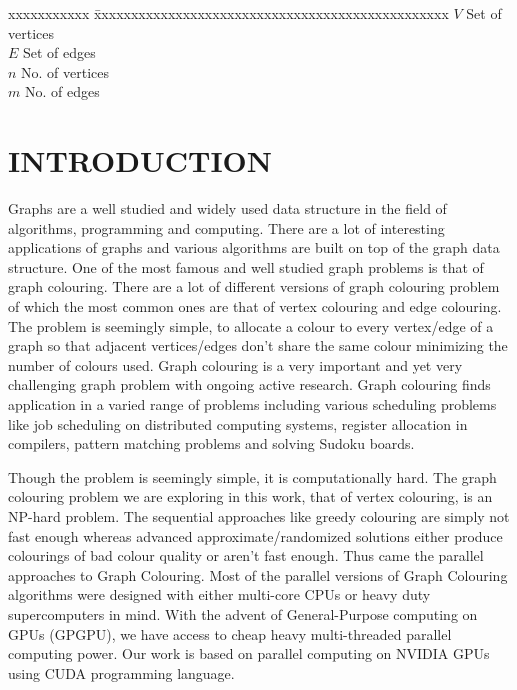 \documentclass[MTech]{iitmdiss}
\begin{document}
\begin{singlespace}
\begin{tabbing}
xxxxxxxxxxx \= xxxxxxxxxxxxxxxxxxxxxxxxxxxxxxxxxxxxxxxxxxxxxxxx \kill
\textbf{$V$}  \> Set of vertices \\
\textbf{$E$}  \> Set of edges \\
\textbf{$n$}   \> No. of vertices \\
\textbf{$m$}  \> No. of edges \\
\end{tabbing}
\end{singlespace}

\pagebreak
\clearpage





\chapter{INTRODUCTION}
\label{chap:intro}
Graphs are a well studied and widely used data structure in the field of algorithms, programming and computing. There are a lot of interesting applications of graphs and various algorithms are built on top of the graph data structure. One of the most famous and well studied graph problems is that of graph colouring. There are a lot of different versions of graph colouring problem of which the most common ones are that of vertex colouring and edge colouring. The problem is seemingly simple, to allocate a colour to every vertex/edge of a graph so that adjacent vertices/edges don't share the same colour minimizing the number of colours used.  
Graph colouring is a very important and yet very challenging graph problem with ongoing active research. Graph colouring finds application in a varied range of problems including various scheduling problems like job scheduling on distributed computing systems, register allocation in compilers, pattern matching problems and solving Sudoku boards.

Though the problem is seemingly simple, it is computationally hard. The graph colouring problem we are exploring in this work, that of vertex colouring, is an NP-hard problem. The sequential approaches like greedy colouring are simply not fast enough whereas advanced approximate/randomized solutions either produce colourings of bad colour quality or aren't fast enough. Thus came the parallel approaches to Graph Colouring. Most of the parallel versions of Graph Colouring algorithms were designed with either multi-core CPUs or heavy duty supercomputers in mind. With the advent of General-Purpose computing on GPUs (GPGPU), we have access to cheap heavy multi-threaded parallel computing power. Our work is based on parallel computing on NVIDIA GPUs using CUDA programming language.
\end{document}
